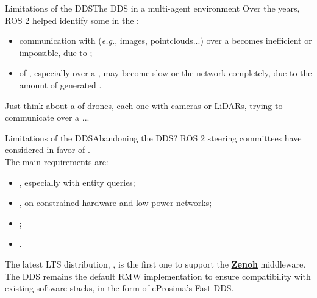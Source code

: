 \begin{frame}{Limitations of the DDS}{The DDS in a multi-agent environment}
  \justifying
	Over the years, ROS 2 helped identify some  in the :
	\begin{itemize}
		\item communication with  (\emph{e.g.}, images, pointclouds...) over a  becomes inefficient or impossible, due to ;
		\item {} of , especially over a , may become slow or  the network completely, due to the amount of generated .
	\end{itemize}
	Just think about a  of drones, each one with cameras or LiDARs, trying to communicate over a ...\\
  \begin{alertblock}{}
    \centering
  \end{alertblock}
\end{frame}
\begin{frame}{Limitations of the DDS}{Abandoning the DDS?}
  \justifying
  ROS 2 steering committees have considered  in favor of .\\
  The main requirements are:
  \begin{itemize}
    \item {}, especially with entity queries;
    \item {}, on constrained hardware and low-power networks;
    \item {};
    \item {}.
  \end{itemize}
  \bigskip
  The latest LTS distribution, , is the first one to support the \href{https://zenoh.io/}{\color{blue}\textbf{\underline{Zenoh}}} middleware.\\
  \smallskip
  The DDS remains the default RMW implementation to ensure compatibility with existing software stacks, in the form of eProsima's Fast DDS.
\end{frame}


